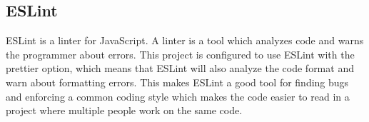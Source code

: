 \subsection{ESLint}
ESLint is a linter for JavaScript. A linter is a tool which analyzes code and warns the programmer about errors. This project is configured to use ESLint with the prettier option, which means that ESLint will also analyze the code format and warn about formatting errors. This makes ESLint a good tool for finding bugs and enforcing a common coding style which makes the code easier to read in a project where multiple people work on the same code.